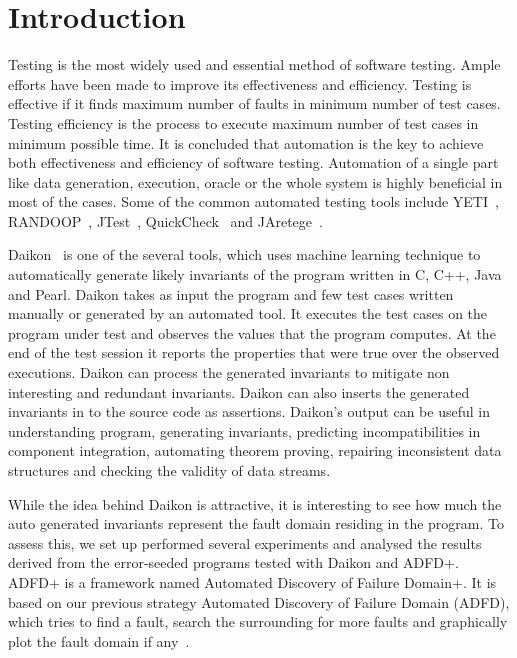\documentclass{acm_proc_article-sp}
\begin{document}








\section{Introduction}\label{sec:intro}
Testing is the most widely used and essential method of software testing. Ample efforts have been made to improve its effectiveness and efficiency. Testing is effective if it finds maximum number of faults in minimum number of test cases. Testing efficiency is the process to execute maximum number of test cases in minimum possible time. It is concluded that automation is the key to achieve both effectiveness and efficiency of software testing. Automation of a single part like data generation, execution, oracle or the whole system is highly beneficial in most of the cases. Some of the common automated testing tools include YETI~\cite{}, RANDOOP~\cite{}, JTest~\cite{}, QuickCheck~\cite{} and JAretege~\cite{}. 

Daikon~\cite{} is one of the several tools, which uses machine learning technique to automatically generate likely invariants of the program written in C, C++, Java and Pearl. Daikon takes as input the program and few test cases written manually or generated by an automated tool. It executes the test cases on the program under test and observes the values that the program computes. At the end of the test session it reports the properties that were true over the observed executions. Daikon can process the generated invariants to mitigate non interesting and redundant invariants. Daikon can also inserts the generated invariants in to the source code as assertions. Daikon's output can be useful in understanding program, generating invariants, predicting incompatibilities in component integration, automating theorem proving, repairing inconsistent data structures and checking the validity of data streams.

While the idea behind Daikon is attractive, it is interesting to see how much the auto generated invariants represent the fault domain residing in the program. To assess this, we set up performed several experiments and analysed the results derived from the error-seeded programs tested with Daikon and ADFD+. ADFD+ is a framework named Automated Discovery of Failure Domain+. It is based on our previous strategy Automated Discovery of Failure Domain (ADFD), which tries to find a fault, search the surrounding for more faults and graphically plot the fault domain if any~\cite{}.  
\end{document}
